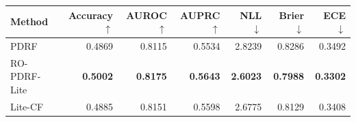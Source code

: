\begin{tabular}{lrrrrrr}
\toprule
Method & Accuracy $\uparrow$ & AUROC $\uparrow$ & AUPRC $\uparrow$ & NLL $\downarrow$ & Brier $\downarrow$ & ECE $\downarrow$ \\
\midrule
PDRF & 0.4869 & 0.8115 & 0.5534 & 2.8239 & 0.8286 & 0.3492 \\
RO-PDRF-Lite & \textbf{0.5002} & \textbf{0.8175} & \textbf{0.5643} & \textbf{2.6023} & \textbf{0.7988} & \textbf{0.3302} \\
Lite-CF & 0.4885 & 0.8151 & 0.5598 & 2.6775 & 0.8129 & 0.3408 \\
\bottomrule
\end{tabular}
